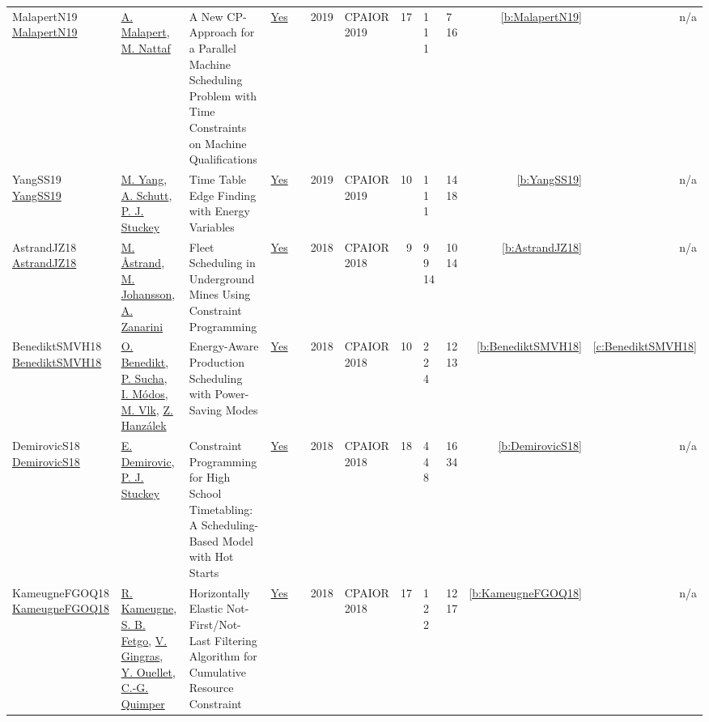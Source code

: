 {\begin{longtable}{>{\raggedright\arraybackslash}p{3cm}>{\raggedright\arraybackslash}p{4.5cm}>{\raggedright\arraybackslash}p{6.0cm}rrrp{2.5cm}rp{1cm}p{1cm}rr}
MalapertN19 \href{https://doi.org/10.1007/978-3-030-19212-9_28}{MalapertN19} & \hyperref[auth:a82]{A. Malapert}, \hyperref[auth:a81]{M. Nattaf} & \cellcolor{green!10}A New CP-Approach for a Parallel Machine Scheduling Problem with Time Constraints on Machine Qualifications & \href{../works/MalapertN19.pdf}{Yes} & \cite{MalapertN19} & 2019 & CPAIOR 2019 & 17 & 1 1 1 & 7 16 & \ref{b:MalapertN19} & n/a\\
YangSS19 \href{https://doi.org/10.1007/978-3-030-19212-9_42}{YangSS19} & \hyperref[auth:a309]{M. Yang}, \hyperref[auth:a124]{A. Schutt}, \hyperref[auth:a125]{P. J. Stuckey} & Time Table Edge Finding with Energy Variables & \href{../works/YangSS19.pdf}{Yes} & \cite{YangSS19} & 2019 & CPAIOR 2019 & 10 & 1 1 1 & 14 18 & \ref{b:YangSS19} & n/a\\
AstrandJZ18 \href{https://doi.org/10.1007/978-3-319-93031-2_44}{AstrandJZ18} & \hyperref[auth:a74]{M. {\AA}strand}, \hyperref[auth:a75]{M. Johansson}, \hyperref[auth:a199]{A. Zanarini} & Fleet Scheduling in Underground Mines Using Constraint Programming & \href{../works/AstrandJZ18.pdf}{Yes} & \cite{AstrandJZ18} & 2018 & CPAIOR 2018 & 9 & 9 9 14 & 10 14 & \ref{b:AstrandJZ18} & n/a\\
BenediktSMVH18 \href{https://doi.org/10.1007/978-3-319-93031-2_6}{BenediktSMVH18} & \hyperref[auth:a114]{O. Benedikt}, \hyperref[auth:a310]{P. Sucha}, \hyperref[auth:a115]{I. M{\'{o}}dos}, \hyperref[auth:a311]{M. Vlk}, \hyperref[auth:a116]{Z. Hanz{\'{a}}lek} & Energy-Aware Production Scheduling with Power-Saving Modes & \href{../works/BenediktSMVH18.pdf}{Yes} & \cite{BenediktSMVH18} & 2018 & CPAIOR 2018 & 10 & 2 2 4 & 12 13 & \ref{b:BenediktSMVH18} & \ref{c:BenediktSMVH18}\\
DemirovicS18 \href{https://doi.org/10.1007/978-3-319-93031-2_10}{DemirovicS18} & \hyperref[auth:a312]{E. Demirovic}, \hyperref[auth:a125]{P. J. Stuckey} & Constraint Programming for High School Timetabling: {A} Scheduling-Based Model with Hot Starts & \href{../works/DemirovicS18.pdf}{Yes} & \cite{DemirovicS18} & 2018 & CPAIOR 2018 & 18 & 4 4 8 & 16 34 & \ref{b:DemirovicS18} & n/a\\
KameugneFGOQ18 \href{https://doi.org/10.1007/978-3-319-93031-2_23}{KameugneFGOQ18} & \hyperref[auth:a10]{R. Kameugne}, \hyperref[auth:a11]{S. B. Fetgo}, \hyperref[auth:a313]{V. Gingras}, \hyperref[auth:a52]{Y. Ouellet}, \hyperref[auth:a37]{C.-G. Quimper} & Horizontally Elastic Not-First/Not-Last Filtering Algorithm for Cumulative Resource Constraint & \href{../works/KameugneFGOQ18.pdf}{Yes} & \cite{KameugneFGOQ18} & 2018 & CPAIOR 2018 & 17 & 1 2 2 & 12 17 & \ref{b:KameugneFGOQ18} & n/a\\

\end{longtable}}
